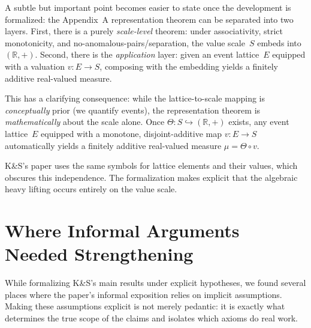\documentclass[11pt]{article}
\begin{document}
A subtle but important point becomes easier to state once the development is formalized:
the Appendix~A representation theorem can be separated into two layers.
First, there is a purely \emph{scale-level} theorem: under associativity, strict monotonicity, and
no-anomalous-pairs/separation, the value scale~$S$ embeds into $(\mathbb{R}, +)$.
Second, there is the \emph{application} layer: given an event lattice~$E$ equipped with a valuation
$v : E \to S$, composing with the embedding yields a finitely additive real-valued measure.

This has a clarifying consequence: while the lattice-to-scale mapping is
\emph{conceptually} prior (we quantify events), the representation theorem is
\emph{mathematically} about the scale alone. Once $\Theta : S \hookrightarrow (\mathbb{R}, +)$
exists, any event lattice~$E$ equipped with a monotone, disjoint-additive map
$v : E \to S$ automatically yields a finitely additive real-valued measure
$\mu = \Theta \circ v$.

K\&S's paper uses the same symbols for lattice elements and their values, which
obscures this independence. The formalization makes explicit that the algebraic
heavy lifting occurs entirely on the value scale.

\section{Where Informal Arguments Needed Strengthening}
\label{sec:strengthening}

While formalizing K\&S's main results under explicit hypotheses, we found several places where
the paper's informal exposition relies on implicit assumptions. Making these assumptions explicit is
not merely pedantic: it is exactly what determines the true scope of the claims and isolates which
axioms do real work.
\end{document}
